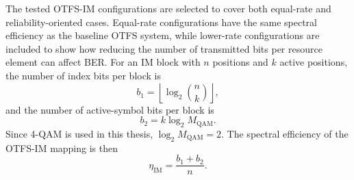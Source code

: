 The tested OTFS-IM configurations are selected to cover both equal-rate and reliability-oriented cases. Equal-rate configurations have the same spectral efficiency as the baseline OTFS system, while lower-rate configurations are included to show how reducing the number of transmitted bits per resource element can affect BER. For an IM block with \(n\) positions and \(k\) active positions, the number of index bits per block is
\begin{equation}
    b_1 = \left\lfloor \log_2 \binom{n}{k} \right\rfloor,
    \label{eq:chapter5_index_bits}
\end{equation}
and the number of active-symbol bits per block is
\begin{equation}
    b_2 = k \log_2 M_{\mathrm{QAM}}.
    \label{eq:chapter5_symbol_bits}
\end{equation}
Since 4-QAM is used in this thesis, \(\log_2 M_{\mathrm{QAM}}=2\). The spectral efficiency of the OTFS-IM mapping is then
\begin{equation}
    \eta_{\mathrm{IM}} = \frac{b_1+b_2}{n}.
    \label{eq:chapter5_im_spectral_efficiency}
\end{equation}


